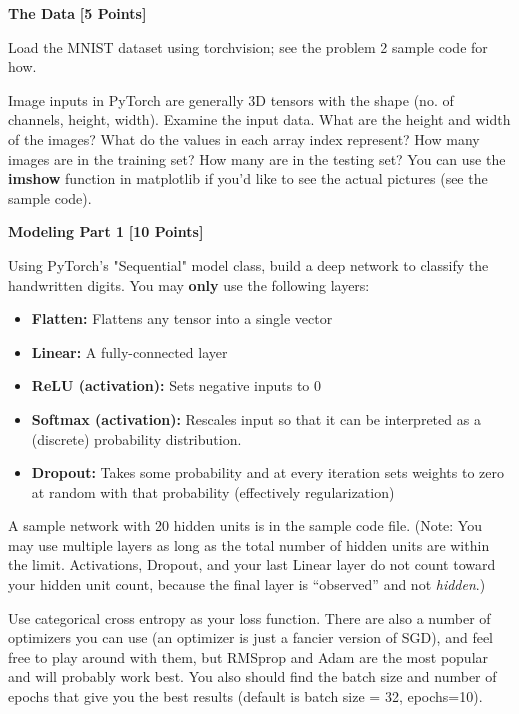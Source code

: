 \begin{solution}

\end{solution}


\problem \textbf{The Data} \textbf{[5 Points]}

Load the MNIST dataset using torchvision; see the problem 2 sample code for how.

Image inputs in PyTorch are generally 3D tensors with the shape (no. of channels, height, width). Examine the input data. What are the height and width of the images? What do the values in each array index represent?  How many images are in the training set? How many are in the testing set? You can use the \textbf{imshow} function in matplotlib if you'd like to see the actual pictures (see the sample code).

\begin{subsolution}

\end{subsolution}

 \problem \textbf{Modeling Part 1} \textbf{[10 Points]}

 Using PyTorch's "Sequential" model class, build a deep network to classify the handwritten digits. You may \textbf{only} use the following layers:

 \begin{itemize}
  \item \textbf{Flatten:} Flattens any tensor into a single vector
  \item \textbf{Linear:} A fully-connected layer
  \item \textbf{ReLU (activation):} Sets negative inputs to 0
  \item \textbf{Softmax (activation):} Rescales input so that it can be interpreted as a (discrete) probability distribution.
  \item \textbf{Dropout:} Takes some probability and at every iteration sets weights to zero at random with that probability (effectively regularization)
\end{itemize}

A sample network with 20 hidden units is in the sample code file. (Note: You may use multiple layers as long as the total number of hidden units are within the limit. Activations, Dropout, and your last Linear layer do not count toward your hidden unit count, because the final layer is ``observed'' and not \emph{hidden}.)

Use categorical cross entropy as your loss function. There are also a number of optimizers  you can use (an optimizer is just a fancier version of SGD), and feel free to play around with them, but RMSprop and Adam are the most popular and will probably work best. You also should find the batch size and number of epochs that give you the best results (default is batch size = 32, epochs=10).

